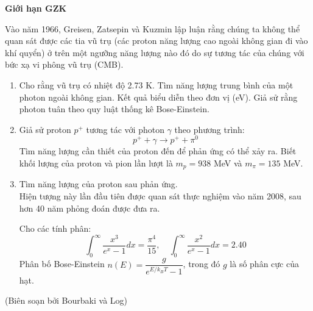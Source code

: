 \textbf{Giới hạn GZK}

\hspace{1 cm}Vào năm 1966, Greisen, Zatsepin và Kuzmin lập luận rằng chúng ta không thể quan sát được các tia vũ trụ (các proton năng lượng cao ngoài không gian đi vào khí quyển) ở trên một ngưỡng năng lượng nào đó do sự tương tác của chúng với bức xạ vi phông vũ trụ (CMB).
\begin{enumerate}
    \item Cho rằng vũ trụ có nhiệt độ 2.73 K. Tìm năng lượng trung bình của một photon ngoài không gian. Kết quả biểu diễn theo đơn vị (eV). Giả sử rằng photon tuân theo quy luật thống kê Bose-Einstein.
    \item Giả sử proton $p^+$ tương tác với photon $\gamma$ theo phương trình:
    $$p^+ + \gamma \longrightarrow p^+ + \pi^0$$ Tìm năng lượng cần thiết của proton đến để phản ứng có thể xảy ra. Biết khối lượng của proton và pion lần lượt là $m_p =938 $ MeV và $m_{\pi}= 135$ MeV.
    \item Tìm năng lượng của proton sau phản ứng.\\
     Hiện tượng này lần đầu tiên được quan sát thực nghiệm vào năm 2008, sau hơn 40 năm phỏng đoán được đưa ra. 
     
     Cho các tính phân:
     $$\int_{0}^{\infty}\frac{x^3}{e^x-1}dx= \frac{\pi^4}{15}, \quad \int_{0}^{\infty}\frac{x^2}{e^x-1}dx= 2.40$$
     Phân bố Bose-Einstein $n(E) = \dfrac{g}{e^{E/k_BT}-1}$, trong đó $g$ là số phân cực của hạt.
\end{enumerate}

\begin{flushright}
    (Biên soạn bởi Bourbaki và Log)
\end{flushright}
